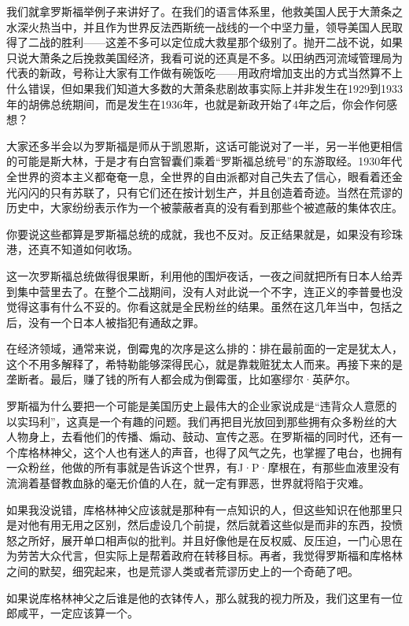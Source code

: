 我们就拿罗斯福举例子来讲好了。在我们的语言体系里，他救美国人民于大萧条之水深火热当中，并且作为世界反法西斯统一战线的一个中坚力量，领导美国人民取得了二战的胜利------这差不多可以定位成大救星那个级别了。抛开二战不说，如果只说大萧条之后挽救美国经济，我看可说的还真是不多。以田纳西河流域管理局为代表的新政，号称让大家有工作做有碗饭吃------用政府增加支出的方式当然算不上什么错误，但如果我们知道大多数的大萧条悲剧故事实际上并非发生在1929到1933年的胡佛总统期间，而是发生在1936年，也就是新政开始了4年之后，你会作何感想？

大家还多半会以为罗斯福是师从于凯恩斯，这话可能说对了一半，另一半他更相信的可能是斯大林，于是才有白宫智囊们乘着``罗斯福总统号''的东游取经。1930年代全世界的资本主义都奄奄一息，全世界的自由派都对自己失去了信心，眼看着还金光闪闪的只有苏联了，只有它们还在按计划生产，并且创造着奇迹。当然在荒谬的历史中，大家纷纷表示作为一个被蒙蔽者真的没有看到那些个被遮蔽的集体农庄。

你要说这些都算是罗斯福总统的成就，我也不反对。反正结果就是，如果没有珍珠港，还真不知道如何收场。

这一次罗斯福总统做得很果断，利用他的围炉夜话，一夜之间就把所有日本人给弄到集中营里去了。在整个二战期间，没有人对此说一个不字，连正义的李普曼也没觉得这事有什么不妥的。你看这就是全民粉丝的结果。虽然在这几年当中，包括之后，没有一个日本人被指犯有通敌之罪。

在经济领域，通常来说，倒霉鬼的次序是这么排的：排在最前面的一定是犹太人，这个不用多解释了，希特勒能够深得民心，就是靠栽赃犹太人而来。再接下来的是垄断者。最后，赚了钱的所有人都会成为倒霉蛋，比如塞缪尔·英萨尔。

罗斯福为什么要把一个可能是美国历史上最伟大的企业家说成是``违背众人意愿的以实玛利''，这真是一个有趣的问题。我们再把目光放回到那些拥有众多粉丝的大人物身上，去看他们的传播、煽动、鼓动、宣传之恶。在罗斯福的同时代，还有一个库格林神父，这个人也有迷人的声音，也得了风气之先，也掌握了电台，也拥有一众粉丝，他做的所有事就是告诉这个世界，有J·P·摩根在，有那些血液里没有流淌着基督教血脉的毫无价值的人在，就一定有罪恶，世界就将陷于灾难。

如果我没说错，库格林神父应该就是那种有一点知识的人，但这些知识在他那里只是对他有用无用之区别，然后虚设几个前提，然后就着这些似是而非的东西，投愤怒之所好，展开单口相声似的批判。并且好像他是在反权威、反压迫，一门心思在为劳苦大众代言，但实际上是帮着政府在转移目标。再者，我觉得罗斯福和库格林之间的默契，细究起来，也是荒谬人类或者荒谬历史上的一个奇葩了吧。

如果说库格林神父之后谁是他的衣钵传人，那么就我的视力所及，我们这里有一位郎咸平，一定应该算一个。

